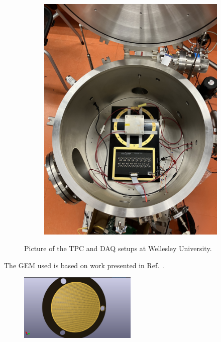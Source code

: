 \begin{figure}[]
\begin{subfigure}{.5\textwidth}
  \includegraphics[width=\textwidth]{images/saq_wellesley_tpc_daq.jpg}
  \caption{}
\end{subfigure}
\caption{Picture of the TPC and DAQ setups at Wellesley University.}
\label{fig:wellesley_tpc}
\end{figure}

The GEM used is based on work presented in Ref.~\citep{THORPE2023167438}.

\begin{figure}[]
\centering
\includegraphics[width=0.5\textwidth]{images/ThGem_layout.png}
\caption{}
\label{fig:saq_th_gem_layout}
\end{figure}


